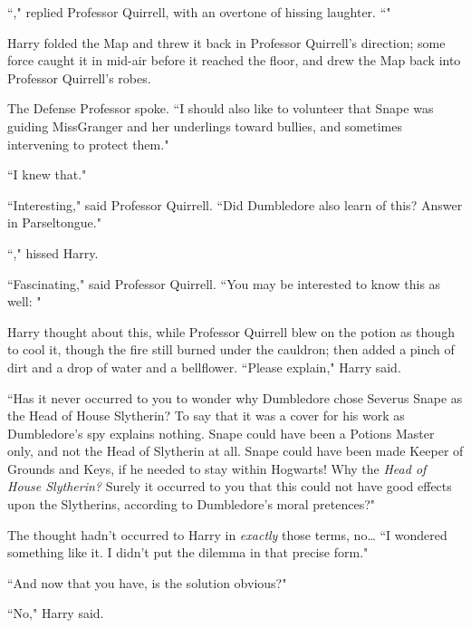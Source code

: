 ``," replied Professor Quirrell, with an overtone of hissing laughter. ``"

Harry folded the Map and threw it back in Professor Quirrell's direction; some force caught it in mid-air before it reached the floor, and drew the Map back into Professor Quirrell's robes.

The Defense Professor spoke. ``I should also like to volunteer that Snape was guiding Miss\?Granger and her underlings toward bullies, and sometimes intervening to protect them."

``I knew that."

``Interesting," said Professor Quirrell. ``Did Dumbledore also learn of this? Answer in Parseltongue."

``," hissed Harry.

``Fascinating," said Professor Quirrell. ``You may be interested to know this as well: "

Harry thought about this, while Professor Quirrell blew on the potion as though to cool it, though the fire still burned under the cauldron; then added a pinch of dirt and a drop of water and a bellflower. ``Please explain," Harry said.

``Has it never occurred to you to wonder why Dumbledore chose Severus Snape as the Head of House Slytherin? To say that it was a cover for his work as Dumbledore's spy explains nothing. Snape could have been a Potions Master only, and not the Head of Slytherin at all. Snape could have been made Keeper of Grounds and Keys, if he needed to stay within Hogwarts! Why the \emph{Head of House Slytherin?} Surely it occurred to you that this could not have good effects upon the Slytherins, according to Dumbledore's moral pretences?"

The thought hadn't occurred to Harry in \emph{exactly} those terms, no{\ldots} ``I wondered something like it. I didn't put the dilemma in that precise form."

``And now that you have, is the solution obvious?"

``No," Harry said.

